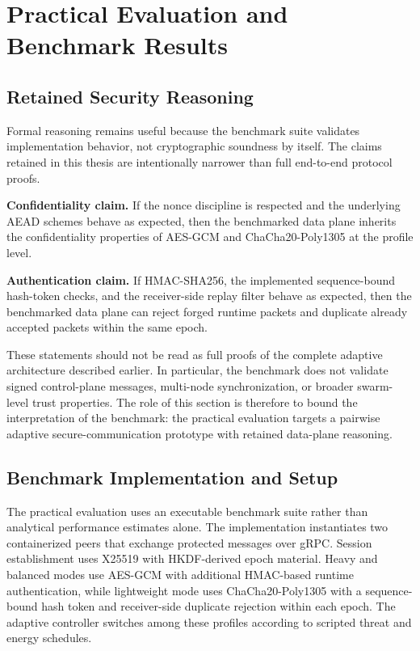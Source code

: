 \chapter{Practical Evaluation and Benchmark Results}
\label{chap:practical_evaluation}

\section{Retained Security Reasoning}
\label{sec:security_proofs}

Formal reasoning remains useful because the benchmark suite validates implementation behavior, not cryptographic soundness by itself. The claims retained in this thesis are intentionally narrower than full end-to-end protocol proofs.

\textbf{Confidentiality claim.}  
If the nonce discipline is respected and the underlying AEAD schemes behave as expected, then the benchmarked data plane inherits the confidentiality properties of AES-GCM and ChaCha20-Poly1305 at the profile level.

\textbf{Authentication claim.}  
If HMAC-SHA256, the implemented sequence-bound hash-token checks, and the receiver-side replay filter behave as expected, then the benchmarked data plane can reject forged runtime packets and duplicate already accepted packets within the same epoch.

These statements should not be read as full proofs of the complete adaptive architecture described earlier. In particular, the benchmark does not validate signed control-plane messages, multi-node synchronization, or broader swarm-level trust properties. The role of this section is therefore to bound the interpretation of the benchmark: the practical evaluation targets a pairwise adaptive secure-communication prototype with retained data-plane reasoning.

\section{Benchmark Implementation and Setup}
\label{sec:benchmark_setup}

The practical evaluation uses an executable benchmark suite rather than analytical performance estimates alone. The implementation instantiates two containerized peers that exchange protected messages over gRPC. Session establishment uses X25519 with HKDF-derived epoch material. Heavy and balanced modes use AES-GCM with additional HMAC-based runtime authentication, while lightweight mode uses ChaCha20-Poly1305 with a sequence-bound hash token and receiver-side duplicate rejection within each epoch. The adaptive controller switches among these profiles according to scripted threat and energy schedules.

